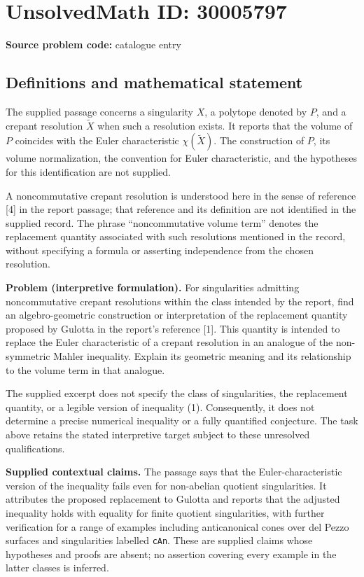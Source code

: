 \documentclass[11pt]{article}
\begin{document}
\section*{UnsolvedMath ID: 30005797}
\textbf{Source problem code:} catalogue entry
\subsection{Definitions and mathematical statement}
The supplied passage concerns a singularity \(X\), a polytope denoted by \(P\), and a crepant resolution \(\widetilde X\) when such a resolution exists. It reports that the volume of \(P\) coincides with the Euler characteristic \(\chi(\widetilde X)\). The construction of \(P\), its volume normalization, the convention for Euler characteristic, and the hypotheses for this identification are not supplied.

A noncommutative crepant resolution is understood here in the sense of reference [4] in the report passage; that reference and its definition are not identified in the supplied record. The phrase ``noncommutative volume term'' denotes the replacement quantity associated with such resolutions mentioned in the record, without specifying a formula or asserting independence from the chosen resolution.

\textbf{Problem (interpretive formulation).} For singularities admitting noncommutative crepant resolutions within the class intended by the report, find an algebro-geometric construction or interpretation of the replacement quantity proposed by Gulotta in the report's reference [1]. This quantity is intended to replace the Euler characteristic of a crepant resolution in an analogue of the non-symmetric Mahler inequality. Explain its geometric meaning and its relationship to the volume term in that analogue.

The supplied excerpt does not specify the class of singularities, the replacement quantity, or a legible version of inequality (1). Consequently, it does not determine a precise numerical inequality or a fully quantified conjecture. The task above retains the stated interpretive target subject to these unresolved qualifications.

\textbf{Supplied contextual claims.} The passage says that the Euler-characteristic version of the inequality fails even for non-abelian quotient singularities. It attributes the proposed replacement to Gulotta and reports that the adjusted inequality holds with equality for finite quotient singularities, with further verification for a range of examples including anticanonical cones over del Pezzo surfaces and singularities labelled \texttt{cAn}. These are supplied claims whose hypotheses and proofs are absent; no assertion covering every example in the latter classes is inferred.
\end{document}
